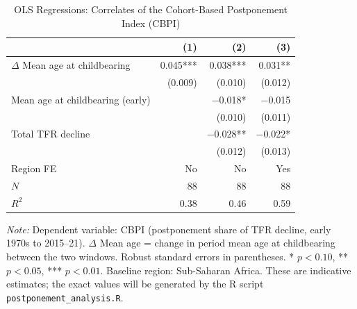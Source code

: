 \documentclass[12pt]{article}
\begin{document}
\begin{table}[H]
\centering
\caption{OLS Regressions: Correlates of the Cohort-Based Postponement
         Index (CBPI)}
\label{tab:regression}
\begin{threeparttable}
\begin{tabular}{lrrr}
\toprule
                                   & (1)       & (2)       & (3) \\
\midrule
$\Delta$ Mean age at childbearing  & 0.045***  & 0.038***  & 0.031**  \\
                                   & (0.009)   & (0.010)   & (0.012)  \\
Mean age at childbearing (early)   &           & $-$0.018* & $-$0.015 \\
                                   &           & (0.010)   & (0.011)  \\
Total TFR decline                  &           & $-$0.028** & $-$0.022* \\
                                   &           & (0.012)   & (0.013)  \\
Region FE                          & No        & No        & Yes      \\
\midrule
$N$                                & 88        & 88        & 88       \\
$R^2$                              & 0.38      & 0.46      & 0.59     \\
\bottomrule
\end{tabular}
\begin{tablenotes}
\footnotesize
\emph{Note:} Dependent variable: CBPI (postponement share of TFR decline,
early 1970s to 2015--21). $\Delta$ Mean age = change in period mean age at
childbearing between the two windows. Robust standard errors in parentheses.
* $p < 0.10$, ** $p < 0.05$, *** $p < 0.01$. Baseline region: Sub-Saharan Africa.
These are indicative estimates; the exact values will be generated by the
R script \texttt{postponement\_analysis.R}.
\end{tablenotes}
\end{threeparttable}
\end{table}
\end{document}
